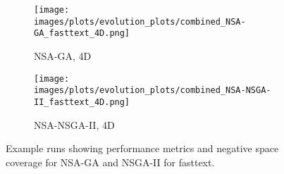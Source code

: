 \begin{figure}[htbp]
    \vspace{0.2cm}
    \begin{subfigure}[b]{0.40\textwidth}
        \texttt{[image: images/plots/evolution\_plots/combined\_NSA-GA\_fasttext\_4D.png]}
        \caption{\scriptsize NSA-GA, 4D}
        \label{subfig:fasttext_NSA-GA_4D}
        \end{subfigure}\hspace{0.05\textwidth}
    \begin{subfigure}[b]{0.40\textwidth}
        \texttt{[image: images/plots/evolution\_plots/combined\_NSA-NSGA-II\_fasttext\_4D.png]}
        \caption{\scriptsize NSA-NSGA-II, 4D}
        \label{subfig:fasttext_NSA-NSGA-II_4D}
        \end{subfigure}
    \caption{\small Example runs showing performance metrics and negative space coverage for NSA-GA and NSGA-II for fasttext.}
        \label{fig:evolution_plots_fasttext}
        \end{figure}
        